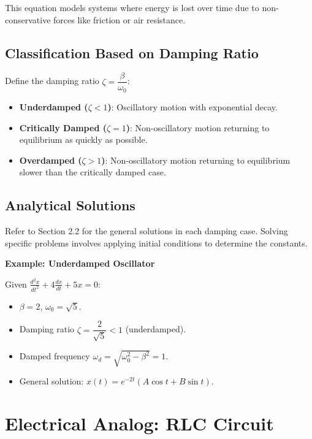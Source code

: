 \documentclass[12pt,a4paper]{article}
\begin{document}
This equation models systems where energy is lost over time due to non-conservative forces like friction or air resistance.

\subsection{Classification Based on Damping Ratio}

Define the damping ratio \( \zeta = \dfrac{\beta}{\omega_0} \):

\begin{itemize}
    \item \textbf{Underdamped (\( \zeta < 1 \))}: Oscillatory motion with exponential decay.
    \item \textbf{Critically Damped (\( \zeta = 1 \))}: Non-oscillatory motion returning to equilibrium as quickly as possible.
    \item \textbf{Overdamped (\( \zeta > 1 \))}: Non-oscillatory motion returning to equilibrium slower than the critically damped case.
\end{itemize}

\subsection{Analytical Solutions}

Refer to Section 2.2 for the general solutions in each damping case. Solving specific problems involves applying initial conditions to determine the constants.

\textbf{Example: Underdamped Oscillator}

Given \( \frac{d^2 x}{dt^2} + 4 \frac{dx}{dt} + 5 x = 0 \):

\begin{itemize}
    \item \( \beta = 2 \), \( \omega_0 = \sqrt{5} \).
    \item Damping ratio \( \zeta = \dfrac{2}{\sqrt{5}} < 1 \) (underdamped).
    \item Damped frequency \( \omega_d = \sqrt{\omega_0^2 - \beta^2} = 1 \).
    \item General solution: \( x(t) = e^{-2 t} (A \cos t + B \sin t) \).
\end{itemize}

\section{Electrical Analog: RLC Circuit}
\end{document}
